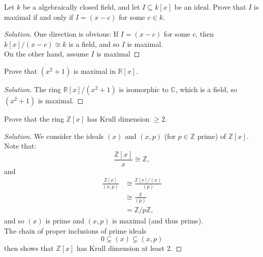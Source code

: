 \documentclass[12pt]{article}
\newenvironment{problem}[2][Problem]{\begin{trivlist}
\item[\hskip \labelsep {\bfseries #1}\hskip \labelsep {\bfseries #2.}]}{\end{trivlist}}
\newenvironment{solution}
  {\renewcommand\qedsymbol{$\blacksquare$}\begin{proof}[Solution]}
{\end{proof}}
\theoremstyle{remark}
\begin{document}
\begin{problem}{4.21}
  Let $k$ be a algebraically closed field, and let $I\subseteq k[x]$ be an 
  ideal.
  Prove that $I$ is maximal if and only if $I=(x-c)$ for some $c\in k$.
\end{problem}
\begin{solution}
  One direction is obvious: If $I=(x-c)$ for some $c$, 
  then $k[x]/(x-c)\cong k$ is a field, and so $I$ is maximal. \\
  \indent On the other hand, assume $I$ is maximal
\end{solution}

\begin{problem}{4.22}
  Prove that $(x^2+1)$ is maximal in $\mathbb{R}[x]$.
\end{problem}
\begin{solution}
  The ring $\mathbb{R}[x]/(x^2+1)$ is isomorphic to $\mathbb{C}$,
  which is a field, so $(x^2+1)$ is maximal.
\end{solution}

\begin{problem}{4.24}
  Prove that the ring $\mathbb{Z}[x]$ has Krull dimension $\geq2$.
\end{problem}
\begin{solution}
  We consider the ideals $(x)$ and $(x,p)$ (for $p\in\mathbb{Z}$ prime)
  of $\mathbb{Z}[x]$.
  Note that:
  \begin{equation*}
    \frac{\mathbb{Z}[x]}{x}\cong\mathbb{Z},
  \end{equation*}
  and
  \begin{align*}
    \frac{\mathbb{Z}[x]}{(x,p)} &\cong \frac{\mathbb{Z}[x]/(x)}{(p)} \\
    &\cong\frac{\mathbb{Z}}{(p)} \\
    &= \mathbb{Z}/p\mathbb{Z},
  \end{align*}
  and so $(x)$ is prime and $(x,p)$ is maximal (and thus prime). \\
  \indent The chain of proper inclusions of prime ideals
  \begin{equation*}
    0\subsetneq (x)\subsetneq (x,p)
  \end{equation*}
  then shows that $\mathbb{Z}[x]$ has Krull dimension at least 2.
\end{solution}
\end{document}
